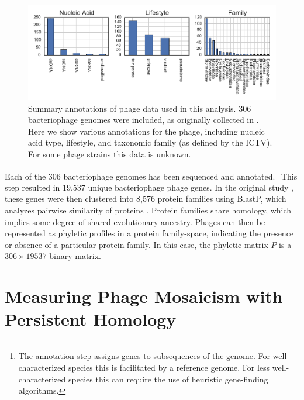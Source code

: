 \begin{figure}
\centering
\includegraphics[]{./fig/phage/phage_data_plots.pdf}
\caption[Summary annotations of 306 bacteriophage strains used in this study]{Summary annotations of phage data used in this analysis. 306 bacteriophage genomes were included, as originally collected in \cite{LimaMendez:2008ki}. Here we show various annotations for the phage, including nucleic acid type, lifestyle, and taxonomic family (as defined by the ICTV). For some phage strains this data is unknown.}
\label{phage:fig:phage_data_plot}
\end{figure}

Each of the 306 bacteriophage genomes has been sequenced and annotated.\footnote{The annotation step assigns genes to subsequences of the genome. For well-characterized species this is facilitated by a reference genome. For less well-characterized species this can require the use of heuristic gene-finding algorithms.}
This step resulted in 19,537 unique bacteriophage phage genes.
In the original study \cite{LimaMendez:2008ki}, these genes were then clustered into 8,576 protein families using BlastP, which analyzes pairwise similarity of proteins \cite{Altschul:1997a}.
Protein families share homology, which implies some degree of shared evolutionary ancestry.
Phages can then be represented as phyletic profiles in a protein family-space, indicating the presence or absence of a particular protein family.
In this case, the phyletic matrix $P$ is a $306\times19537$ binary matrix.

\section{Measuring Phage Mosaicism with Persistent Homology}
\label{phage:ph}

